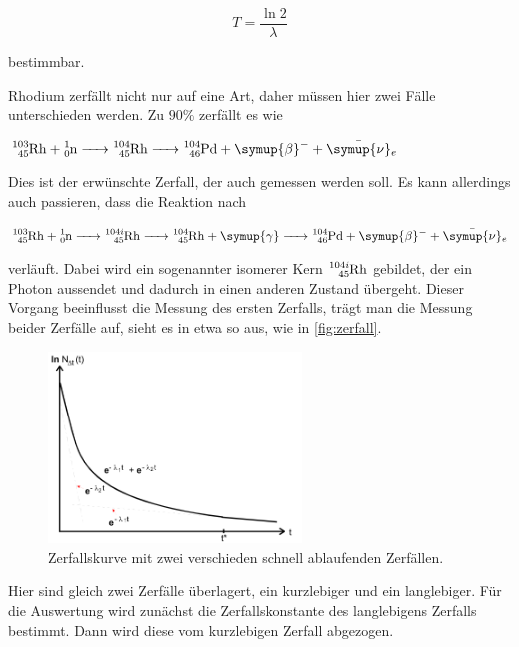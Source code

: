 \begin{equation}
    T = \frac{\ln{2}}{\lambda}
    \label{eq:lambda}
\end{equation}

bestimmbar.



Rhodium zerfällt nicht nur auf eine Art, daher müssen hier zwei Fälle unterschieden werden.
Zu $90\%$ zerfällt es wie

$\ce{^{103}_{45}Rh + ^{1}_0n -> ^{104}_{45}Rh -> ^{104}_{46}Pd + \symup{\beta}- + \bar{\symup{\nu}}_e}$

Dies ist der erwünschte Zerfall, der auch gemessen werden soll.
Es kann allerdings auch passieren, dass die Reaktion nach

$\ce{^{103}_{45}Rh + ^{1}_0n -> ^{104i}_{45}Rh -> ^{104}_{45}Rh + \symup{\gamma} -> ^{104}_{46}Pd + \symup{\beta}- + \bar{\symup{\nu}}_e}$

verläuft.
Dabei wird ein sogenannter isomerer Kern $\ce{^{104i}_{45}Rh}$ gebildet, der ein Photon aussendet und dadurch in einen anderen Zustand übergeht. 
Dieser Vorgang beeinflusst die Messung des ersten Zerfalls, trägt man die Messung beider Zerfälle auf, sieht es in etwa so aus, wie in \autoref{fig:zerfall}.

\begin{figure}
    \centering
    \includegraphics[width=0.6\textwidth]{images/bild2.png}
    \caption{Zerfallskurve mit zwei verschieden schnell ablaufenden Zerfällen.}
    \label{fig:zerfall}
\end{figure}

Hier sind gleich zwei Zerfälle überlagert, ein kurzlebiger und ein langlebiger.
Für die Auswertung wird zunächst die Zerfallskonstante des langlebigens Zerfalls bestimmt.
Dann wird diese vom kurzlebigen Zerfall abgezogen.